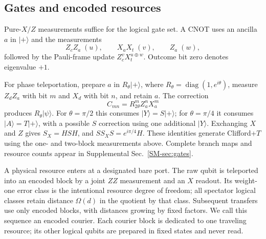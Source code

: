 \subsection{Gates and encoded resources}
Pure-$X/Z$ measurements suffice for the logical gate set. A CNOT uses an
ancilla $a$ in $|+\rangle$ and the measurements
\begin{equation}
 Z_cZ_a\;(u),\qquad X_aX_t\;(v),\qquad Z_a\;(w),
 \label{eq:cnot}
\end{equation}
followed by the Pauli-frame update $Z_c^vX_t^{u\oplus w}$.
Outcome bit zero denotes eigenvalue $+1$.

For phase teleportation, prepare $a$ in $R_\theta|+\rangle$, where
$R_\theta=\operatorname{diag}(1,e^{i\theta})$, measure $Z_dZ_a$ with bit $m$
and $X_d$ with bit $n$, and retain $a$. The correction
\begin{equation}
 C_{mn}=R_{2\theta}^{m}Z_a^nX_a^m
 \label{eq:phase}
\end{equation}
produces $R_\theta|\psi\rangle$. For $\theta=\pi/2$ this consumes
$|Y\rangle=S|+\rangle$; for $\theta=\pi/4$ it consumes
$|A\rangle=T|+\rangle$, with a possible $S$ correction using one additional
$|Y\rangle$. Exchanging $X$ and $Z$ gives $S_X=HSH$, and
$SS_XS=e^{i\pi/4}H$. These identities generate Clifford+$T$ using the
one- and two-block measurements above. Complete branch maps and resource
counts appear in Supplemental Sec.~\ref{SM-sec:gates}.

A physical resource enters at a designated bare port. The raw qubit is
teleported into an encoded block by a joint $ZZ$ measurement and an $X$
readout. Its weight-one error class is the intentional resource degree of
freedom; all spectator logical classes retain distance $\Omega(d)$ in the
quotient by that class. Subsequent transfers use only encoded blocks, with
distances growing by fixed factors. We call this sequence an encoded courier.
Each courier block is dedicated to one traveling resource; its other logical
qubits are prepared in fixed states and never read.

